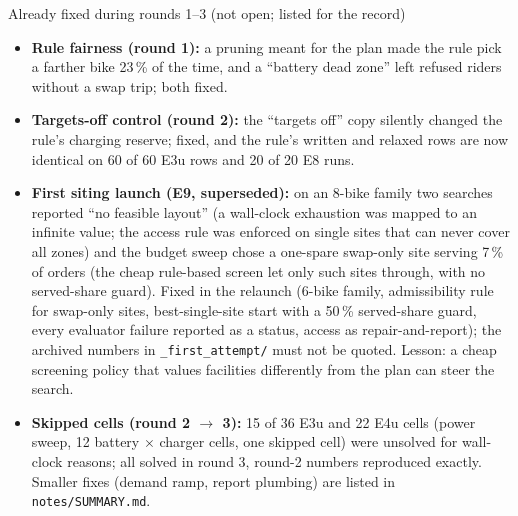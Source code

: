 \begin{notebox}{Already fixed during rounds 1--3 (not open; listed for the record)}
\begin{itemize}\setlength{\itemsep}{1pt}
  \item \textbf{Rule fairness (round 1):} a pruning meant for the plan made the rule pick a farther bike 23\,\% of the time, and a ``battery dead zone'' left refused riders without a swap trip; both fixed.
  \item \textbf{Targets-off control (round 2):} the ``targets off'' copy silently changed the rule's charging reserve; fixed, and the rule's written and relaxed rows are now identical on 60 of 60 E3u rows and 20 of 20 E8 runs.
  \item \textbf{First siting launch (E9, superseded):} on an 8-bike family two searches reported ``no feasible layout'' (a wall-clock exhaustion was mapped to an infinite value; the access rule was enforced on single sites that can never cover all zones) and the budget sweep chose a one-spare swap-only site serving 7\,\% of orders (the cheap rule-based screen let only such sites through, with no served-share guard). Fixed in the relaunch (6-bike family, admissibility rule for swap-only sites, best-single-site start with a 50\,\% served-share guard, every evaluator failure reported as a status, access as repair-and-report); the archived numbers in \texttt{\_first\_attempt/} must not be quoted. Lesson: a cheap screening policy that values facilities differently from the plan can steer the search.
  \item \textbf{Skipped cells (round 2 $\to$ 3):} 15 of 36 E3u and 22 E4u cells (power sweep, 12 battery $\times$ charger cells, one skipped cell) were unsolved for wall-clock reasons; all solved in round 3, round-2 numbers reproduced exactly. Smaller fixes (demand ramp, report plumbing) are listed in \texttt{notes/SUMMARY.md}.
\end{itemize}
\end{notebox}
